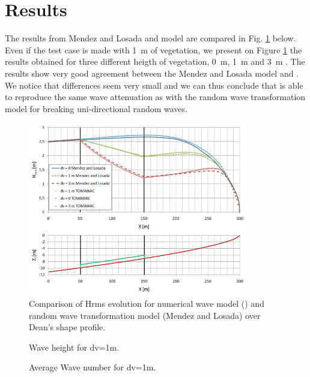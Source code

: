 \section{Results}
%
The results from Mendez and Losada and \tomawac model are compared in Fig.
\ref{figresvito} below. Even if the test case is made with 1~m of vegetation,
we present on Figure \ref{figresvito} the results obtained for three different
heigth of vegetation, 0~m, 1~m and 3~m \cite{Bacchi2014}.
The results show very good agreement between the Mendez  and Losada model
\cite{Mendez2004} and \tomawac. We notice that differences seem very small and
we can thus conclude that \tomawac is able to reproduce the same wave
attenuation as with the random wave transformation model for breaking
uni-directional random waves.
\begin{figure} [!h]
\centering
\includegraphics[width=0.85\textwidth]{resdean.png}
\caption{Comparison of Hrms evolution for numerical wave model (\tomawac) and
  random wave transformation model (Mendez and Losada) over Dean’s shape
  profile.}
\label{figresvito}
\end{figure}

\begin{figure} [!h]
\centering
{}
 \caption{Wave height for dv=1m.}
\label{figrescalc}
\end{figure}

\begin{figure} [!h]
\centering
{}
 \caption{Average Wave number for dv=1m.}
\label{figkmoy}
\end{figure}


